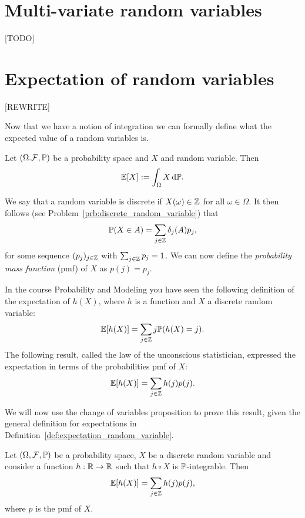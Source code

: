 \section{Multi-variate random variables}

[TODO]

\section{Expectation of random variables}

[REWRITE]

Now that we have a notion of integration we can formally define what the expected value of a random variables is.

\begin{definition}\label{def:expectation_random_variable}
Let $(\Omega. \mathcal F, \mathbb P)$ be a probability space and $X$ and random variable. Then
\[
	\mathbb E[X] := \int_\Omega X \, \mathrm{d} \mathbb P.
\]
\end{definition}

We say that a random variable is discrete if $X(\omega) \in \mathbb Z$ for all $\omega \in \Omega$. It then follows (see Problem~\ref{prb:discrete_random_variable}) that 
\[
	\mathbb P(X \in A) = \sum_{j \in \mathbb Z} \delta_j(A) p_j,
\]
for some sequence $(p_j)_{j \in \mathbb Z}$ with $\sum_{j \in \mathbb Z} p_j = 1$. We can now define the \emph{probability mass function} (pmf) of $X$ as $p(j) = p_j$.

In the course Probability and Modeling you have seen the following definition of the expectation of $h(X)$, where $h$ is a function and $X$ a discrete random variable:
\[
	\mathbb E[h(X)] = \sum_{j \in \mathbb Z} j \mathbb P(h(X) = j).
\]
The following result, called the law of the unconscious statistician, expressed the expectation in terms of the probabilities pmf of $X$:
\[
	\mathbb E[h(X)] = \sum_{j \in \mathbb Z} h(j) p(j).
\] 

We will now use the change of variables proposition to prove this result, given the general definition for expectations in Definition~\ref{def:expectation_random_variable}.


\begin{lemma}
Let $(\Omega, \mathcal F, \mathbb{P})$ be a probability space, $X$ be a discrete random variable and consider a function $h : \mathbb R \to \mathbb R$ such that $h\circ X$ is $\mathbb P$-integrable. Then
\[
	\mathbb E[h(X)] = \sum_{j \in \mathbb Z} h(j) p(j),
\] 
where $p$ is the pmf of $X$.
\end{lemma}

